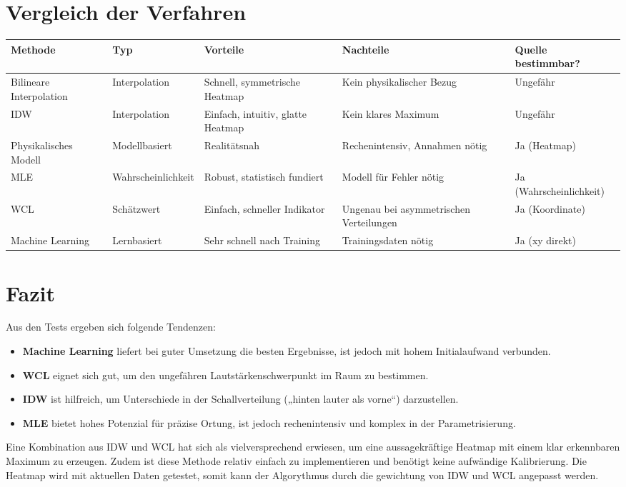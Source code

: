 \section{Vergleich der Verfahren}

\begin{center}
\renewcommand{\arraystretch}{1.2}
\begin{adjustbox}{max width=\textwidth}
\begin{tabular}{|l|l|p{3cm}|p{3cm}|p{2.3cm}|}
\hline
\textbf{Methode} & \textbf{Typ} & \textbf{Vorteile} & \textbf{Nachteile} & \textbf{Quelle bestimmbar?} \\
\hline
Bilineare Interpolation & Interpolation & Schnell, symmetrische Heatmap & Kein physikalischer Bezug & Ungefähr \\
\hline
IDW & Interpolation & Einfach, intuitiv, glatte Heatmap & Kein klares Maximum & Ungefähr \\
\hline
Physikalisches Modell & Modellbasiert & Realitätsnah & Rechenintensiv, Annahmen nötig & Ja (Heatmap) \\
\hline
MLE & Wahrscheinlichkeit & Robust, statistisch fundiert & Modell für Fehler nötig & Ja (Wahrscheinlichkeit) \\
\hline
WCL & Schätzwert & Einfach, schneller Indikator & Ungenau bei asymmetrischen Verteilungen & Ja (Koordinate) \\
\hline
Machine Learning & Lernbasiert & Sehr schnell nach Training & Trainingsdaten nötig & Ja (xy direkt) \\
\hline
\end{tabular}
\end{adjustbox}
\end{center}

\section{Fazit}

Aus den Tests ergeben sich folgende Tendenzen:  
\begin{itemize}
    \item \textbf{Machine Learning} liefert bei guter Umsetzung die besten Ergebnisse, ist jedoch mit hohem Initialaufwand verbunden.
    \item \textbf{WCL} eignet sich gut, um den ungefähren Lautstärkenschwerpunkt im Raum zu bestimmen.
    \item \textbf{IDW} ist hilfreich, um Unterschiede in der Schallverteilung („hinten lauter als vorne“) darzustellen.
    \item \textbf{MLE} bietet hohes Potenzial für präzise Ortung, ist jedoch rechenintensiv und komplex in der Parametrisierung.
\end{itemize}

Eine Kombination aus IDW und WCL hat sich als vielversprechend erwiesen, um eine aussagekräftige Heatmap mit einem klar erkennbaren Maximum zu erzeugen.
Zudem ist diese Methode relativ einfach zu implementieren und benötigt keine aufwändige Kalibrierung.
Die Heatmap wird mit aktuellen Daten getestet, somit kann der Algorythmus durch die gewichtung von IDW und WCL angepasst werden.